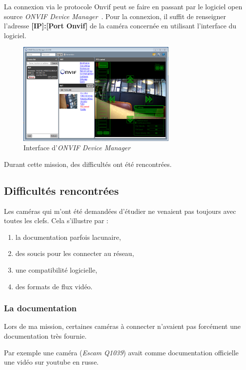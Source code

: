 La connexion via le protocole Onvif peut se faire en passant par le logiciel open source \textit{ONVIF Device Manager}~\cite{Onvifdm}. Pour la connexion, il suffit de renseigner l’adresse \textbf{[IP]:[Port Onvif]} de la caméra concernée en utilisant l'interface du logiciel.

\begin{figure}[H]
	\includegraphics[width=0.7\textwidth]{img/onvifecran.png}
    \centering
    \caption{Interface d'\textit{ONVIF Device Manager}}
\end{figure}

Durant cette mission, des difficultés ont été rencontrées.

	\subsection{Difficultés rencontrées}

Les caméras qui m'ont été demandées d'étudier ne venaient pas toujours avec toutes les clefs. Cela s'illustre par :
\begin{enumerate}
\itemsep -0.5em 
\item la documentation parfois lacunaire,
\item des soucis pour les connecter au réseau,
\item une compatibilité logicielle,
\item des formats de flux vidéo.
\end{enumerate}


		\subsubsection{La documentation}
Lors de ma mission, certaines caméras à connecter n'avaient pas forcément une documentation très fournie.

Par exemple une caméra (\textit{Escam Q1039}) avait comme  documentation officielle une vidéo sur youtube en russe.


